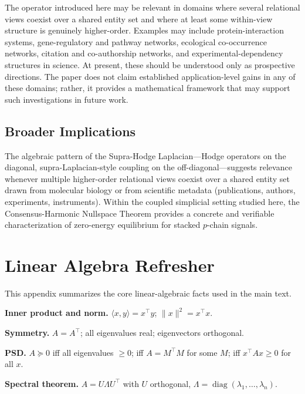 \documentclass[11pt]{article}
\theoremstyle{definition}
\theoremstyle{remark}
\DeclareMathOperator{\diag}{diag}
\begin{document}
The operator introduced here may be relevant in domains where several relational views coexist over a shared entity set and where at least some within-view structure is genuinely higher-order. Examples may include protein-interaction systems, gene-regulatory and pathway networks, ecological co-occurrence networks, citation and co-authorship networks, and experimental-dependency structures in science. At present, these should be understood only as prospective directions. The paper does not claim established application-level gains in any of these domains; rather, it provides a mathematical framework that may support such investigations in future work.

\subsection{Broader Implications}

The algebraic pattern of the Supra-Hodge Laplacian---Hodge operators on the
diagonal, supra-Laplacian-style coupling on the off-diagonal---suggests
relevance whenever multiple higher-order relational views coexist over a shared entity set drawn from molecular biology or from scientific metadata (publications, authors, experiments, instruments). Within the coupled simplicial setting
studied here, the Consensus-Harmonic Nullspace Theorem provides a concrete and
verifiable characterization of zero-energy equilibrium for stacked $p$-chain
signals.


\appendix

\clearpage
\section{Linear Algebra Refresher}
\label{app:linalg}

This appendix summarizes the core linear-algebraic facts used in the main text.

\textbf{Inner product and norm.} $\langle x,y\rangle = x^\top y$;
$\|x\|^2 = x^\top x$.

\textbf{Symmetry.} $A=A^\top$; all eigenvalues real; eigenvectors orthogonal.

\textbf{PSD.} $A\succeq 0$ iff all eigenvalues $\geq 0$; iff $A=M^\top M$ for
some $M$; iff $x^\top Ax\geq 0$ for all $x$.

\textbf{Spectral theorem.} $A=U\Lambda U^\top$ with $U$ orthogonal,
$\Lambda=\diag(\lambda_1,\dots,\lambda_n)$.
\end{document}
